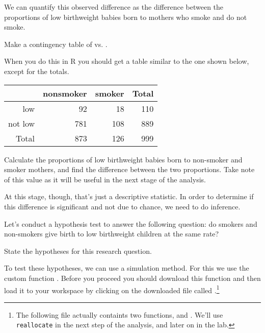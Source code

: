 \documentclass[11pt]{article}
\begin{document}
We can quantify this observed difference as the difference between the proportions of low birthweight babies born to mothers who smoke and do not smoke. 

\begin{exercise}
Make a contingency table of  vs. .
\end{exercise}

When you do this in R  you should get a table similar to the one shown below, except for the totals.

\begin{center}
\begin{tabular}{rrrr}
  \hline
		 & nonsmoker 	& smoker	& Total \\ 
  \hline
low 		&  92 		& 18		& 110 \\ 
not low 	& 781 		& 108 	& 889\\
   \hline
Total 	& 873		& 126 	& 999\\
   \hline
\end{tabular}
\end{center}

\begin{exercise}
Calculate the proportions of low birthweight babies born to non-smoker and smoker mothers, and find the difference between the two proportions. Take note of this value as it will be useful in the next stage of the analysis.
\end{exercise}

At this stage, though, that's just a descriptive statistic.  In order to determine if this difference is significant and not due to chance, we need to do inference.

Let's conduct a hypothesis test to answer the following question: do smokers and non-smokers give birth to low birthweight children at the same rate?

\begin{exercise}
State the hypotheses for this research question.
\end{exercise}

To test these hypotheses, we can use a simulation method. For this we use the custom function . Before you proceed you should download this function and then load it to your workspace by clicking on the downloaded file called .\footnote{The following file actually containts two functions,  and . We'll use \texttt{reallocate} in the next step of the analysis, and  later on in the lab.}
\end{document}
